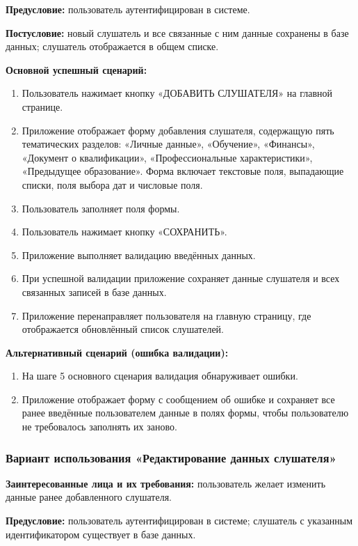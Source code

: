 \textbf{Предусловие:} пользователь аутентифицирован в системе.

\textbf{Постусловие:} новый слушатель и все связанные с ним данные сохранены в базе данных; слушатель отображается в общем списке.

\textbf{Основной успешный сценарий:}
\begin{enumerate}
	\item Пользователь нажимает кнопку «ДОБАВИТЬ СЛУШАТЕЛЯ» на главной странице.
	\item Приложение отображает форму добавления слушателя, содержащую пять тематических разделов: «Личные данные», «Обучение», «Финансы», «Документ о квалификации», «Профессиональные характеристики», «Предыдущее образование». Форма включает текстовые поля, выпадающие списки, поля выбора дат и числовые поля.
	\item Пользователь заполняет поля формы.
	\item Пользователь нажимает кнопку «СОХРАНИТЬ».
	\item Приложение выполняет валидацию введённых данных.
	\item При успешной валидации приложение сохраняет данные слушателя и всех связанных записей в базе данных.
	\item Приложение перенаправляет пользователя на главную страницу, где отображается обновлённый список слушателей.
\end{enumerate}

\textbf{Альтернативный сценарий (ошибка валидации):}
\begin{enumerate}
	\item На шаге 5 основного сценария валидация обнаруживает ошибки.
	\item Приложение отображает форму с сообщением об ошибке и сохраняет все ранее введённые пользователем данные в полях формы, чтобы пользователю не требовалось заполнять их заново.
\end{enumerate}

\subsubsection{Вариант использования «Редактирование данных слушателя»}

\textbf{Заинтересованные лица и их требования:} пользователь желает изменить данные ранее добавленного слушателя.

\textbf{Предусловие:} пользователь аутентифицирован в системе; слушатель с указанным идентификатором существует в базе данных.

